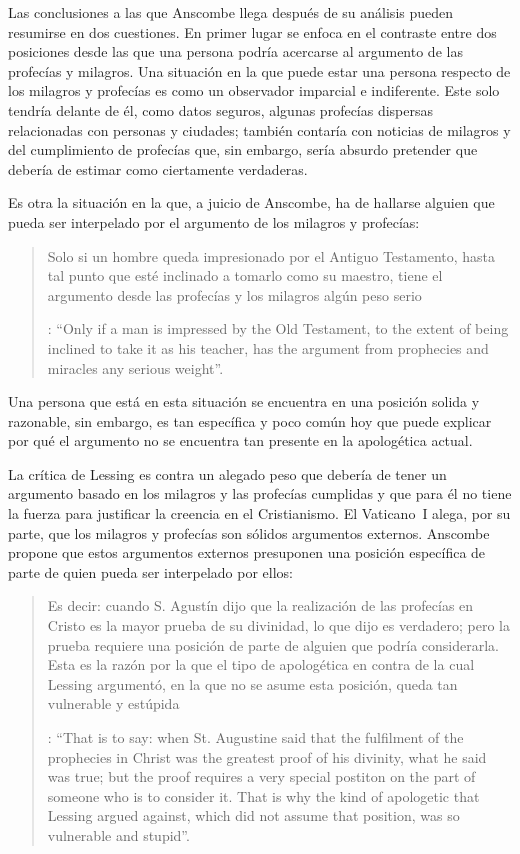 Las conclusiones a las que Anscombe llega después de su análisis pueden resumirse en dos cuestiones. En primer lugar se enfoca en el contraste entre dos posiciones desde las que una persona podría acercarse al argumento de las profecías y milagros. Una situación en la que puede estar una persona respecto de los milagros y profecías es como un observador imparcial e indiferente. Este solo tendría delante de él, como datos seguros, algunas profecías dispersas relacionadas con personas y ciudades; también contaría con noticias de milagros y del cumplimiento de profecías que, sin embargo, sería absurdo pretender que debería de estimar como ciertamente verdaderas.

Es otra la situación en la que, a juicio de Anscombe, ha de hallarse alguien que pueda ser interpelado por el argumento de los milagros y profecías: \blockquote[{\Cite[35]{anscombe2008faith:prophandmi}}: \enquote{Only if a man is impressed by the Old Testament, to the extent of being inclined to take it as his teacher, has the argument from prophecies and miracles any serious weight}.]{Solo si un hombre queda impresionado por el Antiguo Testamento, hasta tal punto que esté inclinado a tomarlo como su maestro, tiene el argumento desde las profecías y los milagros algún peso serio}. Una persona que está en esta situación se encuentra en una posición solida y razonable, sin embargo, es tan específica y poco común hoy que puede explicar por qué el argumento no se encuentra tan presente en la apologética actual.

La crítica de Lessing es contra un alegado peso que debería de tener un argumento basado en los milagros y las profecías cumplidas y que para él no tiene la fuerza para justificar la creencia en el Cristianismo. El Vaticano~I alega, por su parte, que los milagros y profecías son sólidos argumentos externos. Anscombe propone que estos argumentos externos presuponen una posición específica de parte de quien pueda ser interpelado por ellos: \blockquote[{\Cite[37]{anscombe2008faith:prophandmi}}: \enquote{That is to say: when St. Augustine said that the fulfilment of the prophecies in Christ was the greatest proof of his divinity, what he said was true; but the proof requires a very special postiton on the part of someone who is to consider it. That is why the kind of apologetic that Lessing argued against, which did not assume that position, was so vulnerable and stupid}.]{Es decir: cuando S. Agustín dijo que la realización de las profecías en Cristo es la mayor prueba de su divinidad, lo que dijo es verdadero; pero la prueba requiere una posición de parte de alguien que podría considerarla. Esta es la razón por la que el tipo de apologética en contra de la cual Lessing argumentó, en la que no se asume esta posición, queda tan vulnerable y estúpida}.

